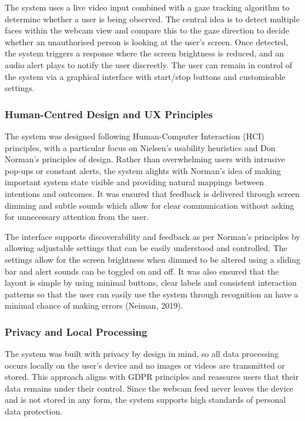 \documentclass[12pt]{article}
\theoremstyle{plain}
\theoremstyle{definition}
\begin{document}
The system uses a live video input combined with a gaze tracking algorithm to determine whether a user is being observed. The central idea is to detect multiple faces within the webcam view and compare this to the gaze direction to decide whether an unauthorised person is looking at the user’s screen. Once detected, the system triggers a response where the screen brightness is reduced, and an audio alert plays to notify the user discreetly. The user can remain in control of the system via a graphical interface with start/stop buttons and customisable settings.

\subsubsection{Human-Centred Design and UX Principles}
\label{HCI}

The system was designed following Human-Computer Interaction (HCI) principles, with a particular focus on Nielsen’s usability heuristics and Don Norman’s principles of design. Rather than overwhelming users with intrusive pop-ups or constant alerts, the system alights with Norman’s idea of making important system state visible and providing natural mappings between intentions and outcomes. It was ensured that feedback is delivered through screen dimming and subtle sounds which allow for clear communication without asking for unnecessary attention from the user.

The interface supports discoverability and feedback as per Norman’s principles by allowing adjustable settings that can be easily understood and controlled. The settings allow for the screen brightness when dimmed to be altered using a sliding bar and alert sounds can be toggled on and off. It was also ensured that the layout is simple by using minimal buttons, clear labels and consistent interaction patterns so that the user can easily use the system through recognition an have a minimal chance of making errors (Neiman, 2019).

\subsubsection{Privacy and Local Processing}
\label{privacy}

The system was built with privacy by design in mind, so all data processing occurs locally on the user’s device and no images or videos are transmitted or stored. This approach aligns with GDPR principles and reassures users that their data remains under their control. Since the webcam feed never leaves the device and is not stored in any form, the system supports high standards of personal data protection.
\end{document}
